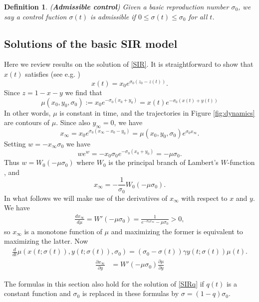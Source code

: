 \documentclass[english,12pt]{article}
\newtheorem{dfn}{Definition}
\newcommand{\Rnot}{\sigma_0}
\newcommand{\Sinf}{x_\infty}
\newcommand{\dom}{{\mathcal D}}
\begin{document}
\begin{dfn} ({\bf Admissible control})
Given a basic reproduction number $\Rnot$, we say a control fuction $\sigma(t)$ is
admissible if $0\le \sigma(t) \le \sigma_0$ for all $t$.
\end{dfn}

\subsection{Solutions of the basic SIR model}
Here we review results on the solution of \eqref{SIR}.
It is straightforward to show that $x(t)$ satisfies (see e.g.
\cite{harko2014exact,pakes2015lambert})
$$
    x(t) = x_0 e^{\Rnot(z_0-z(t))}.
$$
Since $z=1-x-y$ we find that
$$
   \mu(x_0,y_0,\Rnot) := x_0 e^{-\Rnot(x_0+y_0)} =  x(t) e^{-\Rnot(x(t)+y(t))} 
$$
In other words, $\mu$ is constant in time, and the trajectories
in Figure \ref{fig:dynamics} are contours of $\mu$.
Since also $y_\infty=0$, we have
$$
    x_\infty = x_0 e^{\Rnot(x_\infty-x_0-y_0)} = \mu(x_0,y_0,\Rnot) e^{\Rnot x_\infty}.
$$
Setting $w=-x_\infty \Rnot$ we have
$$
    we^w = -x_0 \Rnot e^{-\Rnot(x_0+y_0)} = -\mu \Rnot.
$$
Thus $w = W_0(-\mu\Rnot)$ where $W_0$ is the principal branch of Lambert's $W$-function \cite{pakes2015lambert},
and
$$
    x_\infty = -\frac{1}{\Rnot}W_0(-\mu \Rnot).
$$
In what follows we will make use of the derivatives of $\Sinf$ with respect to $x$ and $y$.
We have
\begin{align*}
\frac{d \Sinf}{d\mu} = W'(-\mu \Rnot) = \frac{1}{e^{-\Rnot\Sinf}-\mu \Rnot} > 0,
\end{align*}
so $\Sinf$ is a monotone function of $\mu$ and maximizing the former is equivalent to
maximizing the latter.
Now
\begin{align*}
    \frac{d}{dt} \mu(x(t;\sigma(t)),y(t;\sigma(t)),\Rnot) = (\Rnot-\sigma(t))\gamma y(t;\sigma(t)) \mu(t).
\end{align*}
\begin{align*}
    \frac{\partial \Sinf}{\partial y} & = W'(-\mu\Rnot) \frac{\partial \mu}{\partial y}
\end{align*}


The formulas in this section also hold for the solution of \eqref{SIRq} if
$q(t)$ is a constant function and $\Rnot$ is replaced in these formulas by
$\sigma=(1-q)\Rnot$.


\end{document}
